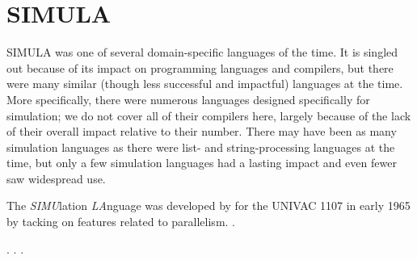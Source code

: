 \section{SIMULA}
\label{sec:simula}

SIMULA was one of several domain-specific languages of the time.
It is singled out because of its impact on programming languages and compilers,
but there were many similar (though less successful and impactful) languages
at the time.
More specifically, there were numerous languages designed specifically for simulation;
we do not cover all of their compilers here, largely because of the lack of their
overall impact relative to their number.
There may have been as many simulation languages as there were list- and string-processing
languages at the time, but only a few simulation languages had a lasting impact
and even fewer saw widespread use.

The \textit{SIMU}lation \textit{LA}nguage was developed by 
for the UNIVAC 1107 in early 1965 by tacking on features related to parallelism.
.

\parencite{twobit_oop_before_simula_2019}.
\parencite{holmevik_history_of_simula_1995}.
\parencite{dahl_birth_of_object_orientation_simula_2004}.
